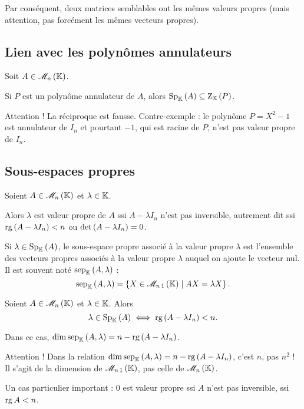 Par conséquent, deux matrices semblables ont les mêmes valeurs propres (mais attention, pas forcément les mêmes vecteurs propres).

\subsection{Lien avec les polynômes annulateurs}

\begin{prop}
Soit \(A\in\M{n}\).

Si \(P\) est un polynôme annulateur de \(A\), alors \(\Sp[\K]{A}\subset\rac{P}\).
\end{prop}

Attention ! La réciproque est fausse. Contre-exemple : le polynôme \(P=X^2-1\) est annulateur de \(I_n\) et pourtant \(-1\), qui est racine de \(P\), n'est pas valeur propre de \(I_n\).

\subsection{Sous-espaces propres}

\begin{prop}
Soient \(A\in\M{n}\) et \(\lambda\in\mathbb{K}\).

Alors \(\lambda\) est valeur propre de \(A\) ssi \(A-\lambda I_n\) n'est pas inversible, autrement dit ssi \(\operatorname{rg}\left(A-\lambda I_n\right)<n\) ou \(\det\left(A-\lambda I_n\right)=0\).
\end{prop}

Si \(\lambda\in\Sp[\K]{A}\), le sous-espace propre associé à la valeur propre \(\lambda\) est l'ensemble des vecteurs propres associés à la valeur propre \(\lambda\) auquel on ajoute le vecteur nul. Il est souvent noté \(\sep[\K]{A}{\lambda}\) : \[\sep[\K]{A}{\lambda}=\accol{X\in\M{n\,1}\tq AX=\lambda X}.\]

\begin{prop}
Soient \(A\in\M{n}\) et \(\lambda\in\mathbb{K}\). Alors \[\lambda\in\Sp[\K]{A}\ssi\rg\paren{A-\lambda I_n}<n.\]

Dans ce cas, \(\dim\sep[\K]{A}{\lambda}=n-\rg\paren{A-\lambda I_n}\).
\end{prop}

Attention ! Dans la relation \(\dim\sep[\K]{A}{\lambda}=n-\rg\paren{A-\lambda I_n}\), c'est \(n\), pas \(n^2\) ! Il s'agit de la dimension de \(\M{n\,1}\), pas celle de \(\M{n}\).

\begin{rem}
Un cas particulier important : \(0\) est valeur propre ssi \(A\) n'est pas inversible, \cad ssi \(\operatorname{rg} A<n\).
\end{rem}

